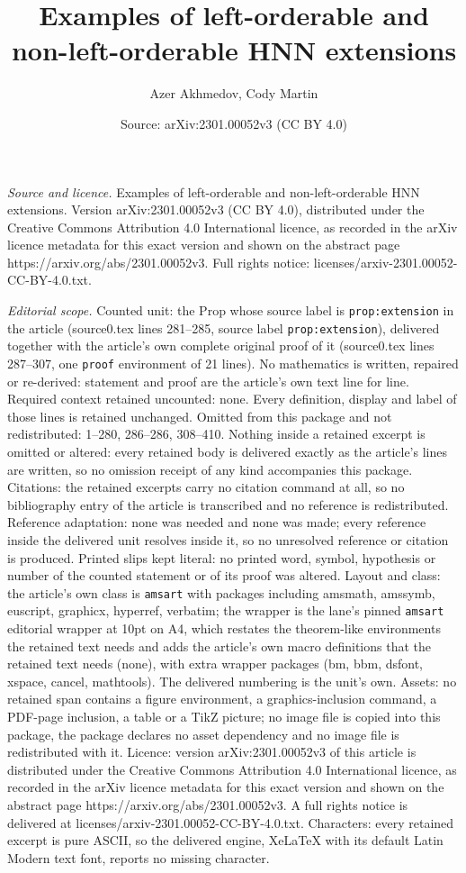\documentclass[10pt,a4paper]{amsart}
\title[Examples of left-orderable and non-left-orderable HNN extens]{Examples of left-orderable and non-left-orderable HNN extensions}
\author{Azer Akhmedov, Cody Martin}
\date{Source: arXiv:2301.00052v3 (CC BY 4.0)}
\begin{document}
\maketitle

\noindent\emph{Source and licence.} Examples of left-orderable and non-left-orderable HNN extensions. Version arXiv:2301.00052v3 (CC BY 4.0), distributed under the Creative Commons Attribution 4.0 International licence, as recorded in the arXiv licence metadata for this exact version and shown on the abstract page https://arxiv.org/abs/2301.00052v3. Full rights notice: licenses/arxiv-2301.00052-CC-BY-4.0.txt.\par\smallskip

\noindent\textit{Editorial scope.} Counted unit: the Prop whose source label is \texttt{prop:extension} in the article (source0.tex lines 281--285, source label \texttt{prop:extension}), delivered together with the article's own complete original proof of it (source0.tex lines 287--307, one \texttt{proof} environment of 21 lines). No mathematics is written, repaired or re-derived: statement and proof are the article's own text line for line. Required context retained uncounted: none. Every definition, display and label of those lines is retained unchanged. Omitted from this package and not redistributed: 1--280, 286--286, 308--410. Nothing inside a retained excerpt is omitted or altered: every retained body is delivered exactly as the article's lines are written, so no omission receipt of any kind accompanies this package. Citations: the retained excerpts carry no citation command at all, so no bibliography entry of the article is transcribed and no reference is redistributed. Reference adaptation: none was needed and none was made; every reference inside the delivered unit resolves inside it, so no unresolved reference or citation is produced. Printed slips kept literal: no printed word, symbol, hypothesis or number of the counted statement or of its proof was altered. Layout and class: the article's own class is \texttt{amsart} with packages including amsmath, amssymb, euscript, graphicx, hyperref, verbatim; the wrapper is the lane's pinned \texttt{amsart} editorial wrapper at 10pt on A4, which restates the theorem-like environments the retained text needs and adds the article's own macro definitions that the retained text needs (none), with extra wrapper packages (bm, bbm, dsfont, xspace, cancel, mathtools). The delivered numbering is the unit's own. Assets: no retained span contains a figure environment, a graphics-inclusion command, a PDF-page inclusion, a table or a TikZ picture; no image file is copied into this package, the package declares no asset dependency and no image file is redistributed with it. Licence: version arXiv:2301.00052v3 of this article is distributed under the Creative Commons Attribution 4.0 International licence, as recorded in the arXiv licence metadata for this exact version and shown on the abstract page https://arxiv.org/abs/2301.00052v3. A full rights notice is delivered at licenses/arxiv-2301.00052-CC-BY-4.0.txt. Characters: every retained excerpt is pure ASCII, so the delivered engine, XeLaTeX with its default Latin Modern text font, reports no missing character.
\end{document}
